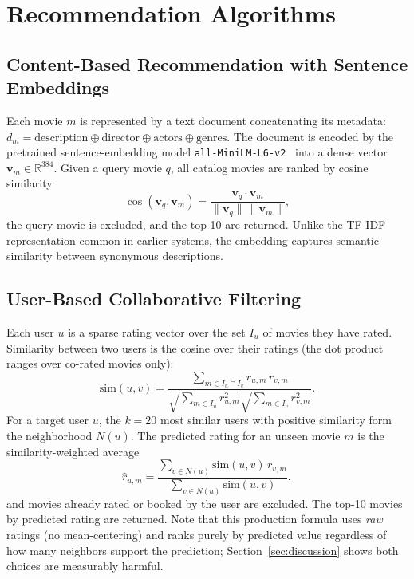 \documentclass[conference]{IEEEtran}
\begin{document}
\section{Recommendation Algorithms}\label{sec:algorithms}

\subsection{Content-Based Recommendation with Sentence Embeddings}
Each movie $m$ is represented by a text document concatenating its metadata:
$d_m = \text{description} \oplus \text{director} \oplus \text{actors} \oplus
\text{genres}$. The document is encoded by the pretrained sentence-embedding
model \texttt{all-MiniLM-L6-v2}~\cite{reimers2019sbert,wang2020minilm} into a
dense vector $\mathbf{v}_m \in \mathbb{R}^{384}$. Given a query movie $q$, all
catalog movies are ranked by cosine similarity
\begin{equation}
\cos(\mathbf{v}_q,\mathbf{v}_m)=
\frac{\mathbf{v}_q\cdot\mathbf{v}_m}{\lVert\mathbf{v}_q\rVert\,\lVert\mathbf{v}_m\rVert},
\end{equation}
the query movie is excluded, and the top-10 are returned. Unlike the TF-IDF
representation common in earlier systems, the embedding captures semantic
similarity between synonymous descriptions.

\subsection{User-Based Collaborative Filtering}
Each user $u$ is a sparse rating vector over the set $I_u$ of movies they have
rated. Similarity between two users is the cosine over their ratings (the dot
product ranges over co-rated movies only):
\begin{equation}
\mathrm{sim}(u,v)=
\frac{\sum_{m\in I_u\cap I_v} r_{u,m}\,r_{v,m}}
{\sqrt{\sum_{m\in I_u} r_{u,m}^2}\sqrt{\sum_{m\in I_v} r_{v,m}^2}}.
\end{equation}
For a target user $u$, the $k=20$ most similar users with positive similarity
form the neighborhood $N(u)$. The predicted rating for an unseen movie $m$ is
the similarity-weighted average
\begin{equation}\label{eq:cfpred}
\hat{r}_{u,m}=
\frac{\sum_{v\in N(u)}\mathrm{sim}(u,v)\,r_{v,m}}
{\sum_{v\in N(u)}\mathrm{sim}(u,v)},
\end{equation}
and movies already rated or booked by the user are excluded. The top-10 movies
by predicted rating are returned. Note that this production formula uses
\emph{raw} ratings (no mean-centering) and ranks purely by predicted value
regardless of how many neighbors support the prediction;
Section~\ref{sec:discussion} shows both choices are measurably harmful.
\end{document}
